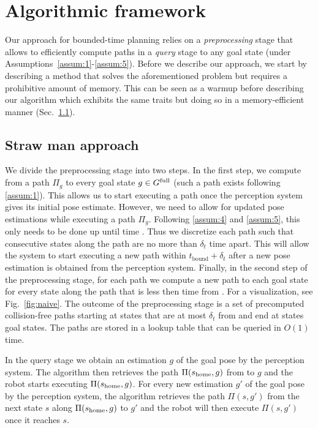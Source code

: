 \documentclass[conference]{IEEEtran}
\begin{document}
\section{Algorithmic framework}
\label{subsec:strawman}
Our approach for bounded-time planning relies on a \emph{preprocessing} stage that allows to efficiently compute paths in a \emph{query} stage to any goal state (under Assumptions~\ref{assum:1}-\ref{assum:5}). 
%
Before we describe our approach, we start by describing a \naive method that solves the aforementioned problem but requires a prohibitive amount of memory.
%
This can be seen as a warmup before describing our algorithm which exhibits the same traits but doing so in a memory-efficient manner (Sec.~\ref{}).

\subsection{Straw man approach}
We divide the preprocessing stage into two steps.
In the first step, we compute from \Shome a path $\Pi_g$ to every goal state $ g \in G^{\textrm{full}}$ (such a path exists following \ref{assum:1}).
This allows us to start executing a path once the perception system gives its initial pose estimate.
However, we need to allow for updated pose estimations while executing a path $\Pi_g$.
%
Following \ref{assum:4} and \ref{assum:5}, this only needs to be done up until time \Trc.
Thus we discretize each path such that consecutive states along the path are no more than $\delta _t$ time apart. This will allow the system to start executing a new path within $t_{\textrm{bound}} + \delta_t$ after a new pose estimation is obtained from the perception system.
%
Finally, in the second step of the preprocessing stage, for each path we compute a new path to each goal state for every state along the path that is less then \Trc time from \Shome.
For a visualization, see Fig.~\ref{fig:naive}.
%
The outcome of the preprocessing stage is a set of precomputed collision-free paths starting at states that are at most $\delta_t$ from \Shome and end at states goal states.
The paths are stored in a lookup table that can be queried in $O(1)$ time.

In the query stage we obtain an estimation $g$ of the goal pose by the perception system. 
The algorithm then retrieves the path $\Pi(s_{\textrm{home}},g)$ from \Shome to $g$ and the robot starts executing $\Pi(s_{\textrm{home}},g)$.
%
For every new estimation $g'$ of the goal pose by the perception system, the algorithm retrieves the path $\Pi(s,g')$ from the next state $s$ along $\Pi(s_{\textrm{home}},g)$ to $g'$ and the robot will then execute $\Pi(s,g')$ once it reaches $s$.
\end{document}
